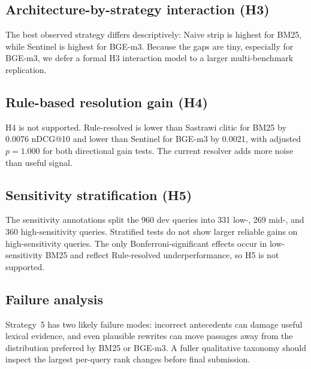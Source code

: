 \subsection{Architecture-by-strategy interaction (H3)}

The best observed strategy differs descriptively: Naive strip is highest for BM25, while Sentinel is highest for BGE-m3. Because the gaps are tiny, especially for BGE-m3, we defer a formal H3 interaction model to a larger multi-benchmark replication.

\subsection{Rule-based resolution gain (H4)}

H4 is not supported. Rule-resolved is lower than Sastrawi clitic for BM25 by 0.0076 nDCG@10 and lower than Sentinel for BGE-m3 by 0.0021, with adjusted $p = 1.000$ for both directional gain tests. The current resolver adds more noise than useful signal.

\subsection{Sensitivity stratification (H5)}

The sensitivity annotations split the 960 dev queries into 331 low-, 269 mid-, and 360 high-sensitivity queries. Stratified tests do not show larger reliable gains on high-sensitivity queries. The only Bonferroni-significant effects occur in low-sensitivity BM25 and reflect Rule-resolved underperformance, so H5 is not supported.

\subsection{Failure analysis}

Strategy~5 has two likely failure modes: incorrect antecedents can damage useful lexical evidence, and even plausible rewrites can move passages away from the distribution preferred by BM25 or BGE-m3. A fuller qualitative taxonomy should inspect the largest per-query rank changes before final submission.
